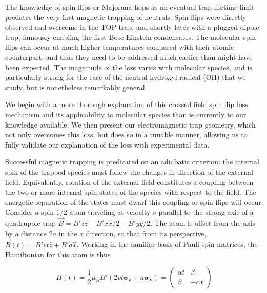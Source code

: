 \documentclass[%
 reprint,
 amsmath,amssymb,
 aps,
prl,
]{revtex4-1}
\begin{document}
The knowledge of spin flips or Majorana hops as an eventual trap lifetime limit predates the very first magnetic trapping of neutrals\cite{Migdall1985}. Spin flips were directly observed and overcome in the TOP trap\cite{Petrich1995}, and shortly later with a plugged dipole trap\cite{Davis1995}, famously enabling the first Bose-Einstein condensates. The molecular spin-flips can occur at much higher temperatures compared with their atomic counterpart, and thus they need to be addressed much earlier than might have been expected. The magnitude of the loss varies with molecular species, and is particularly strong for the case of the neutral hydroxyl radical (OH) that we study, but is nonetheless remarkably general.

We begin with a more thorough explanation of this crossed field spin flip loss mechanism and its applicability to molecular species than is currently to our knowledge available. We then present our electromagnetic trap geometry, which not only overcomes this loss, but does so in a tunable manner, allowing us to fully validate our explanation of the loss with experimental data.


Successful magnetic trapping is predicated on an adiabatic criterion: the internal spin of the trapped species must follow the changes in direction of the external field. Equivalently, rotation of the external field constitutes a coupling between the two or more internal spin states of the species with respect to the field. The energetic separation of the states must dwarf this coupling or spin-flips will occur. Consider a spin $1/2$ atom traveling at velocity $v$ parallel to the strong axis of a quadrupole trap $\vec{B}=B'z\hat{z}-B'x\hat{x}/2-B'y\hat{y}/2$. The atom is offset from the axis by a distance $2a$ in the $x$ direction, so that from its perspective, $\vec{B}(t)=B'vt\hat{z} + B'a\hat{x}$. Working in the familiar basis of Pauli spin matrices, the Hamiltonian for this atom is thus

\begin{equation}
H(t) = \frac{1}{2}\mu_BB'(2vt\boldsymbol{\sigma_z} + a\boldsymbol{\sigma_x}) = \begin{pmatrix} \alpha t & \beta \\ \beta & -\alpha t \end{pmatrix}
\end{equation}
\end{document}
